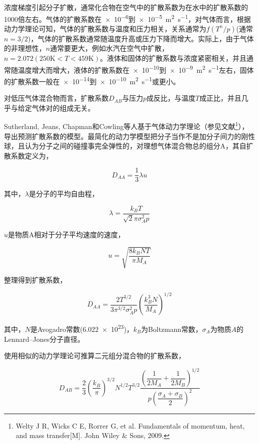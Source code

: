 浓度梯度引起分子扩散，通常化合物在空气中的扩散系数为在水中的扩散系数的1000倍左右。气体的扩散系数在\num{e-6}到\num{e-5}~\si{\square\meter\per\second}，对气体而言，根据动力学理论可知，气体的扩散系数与温度和压力相关，关系通常为$ f(T^n/p) $(通常$ n=3/2 $)，气体的扩散系数通常随温度升高或压力下降而增大。实际上，由于气体的非理想性，$ n $通常要更大，例如水汽在空气中扩散，$ n=2.072(250\si{\kelvin}<T<459\si{\kelvin}) $。液体和固体的扩散系数与浓度紧密相关，并且通常随温度增大而增大，液体的扩散系数在\num{e-10}到\num{e-9}~\si{\meter\squared\per\second}左右，固体的扩散系数一般在\num{e-14}到\num{e-10}~\si{\meter\squared\per\second}或更小。

对低压气体混合物而言，扩散系数$ D_{AB} $与压力$ p $成反比，与温度$ T $成正比，并且几乎与给定气体对的组成无关。

Sutherland, Jeans, Chapman和Cowling等人基于气体动力学理论（参见文献\footnote{Welty J R, Wicks C E, Rorrer G, et al. Fundamentals of momentum, heat, and mass transfer[M]. John Wiley \& Sons, 2009.}），导出预测扩散系数的模型。最简化的动力学模型把分子当作不是加分子间力的刚性球，且认为分子之间的碰撞事完全弹性的，对理想气体混合物总的组分A，其自扩散系数定义为，

\begin{equation}
D_{AA} = \frac{1}{3}\lambda u
\end{equation}

其中，$ \lambda $是分子的平均自由程，

\begin{equation}
\lambda = \frac{k_B T}{\sqrt{2}\pi\sigma_A^2 p}
\end{equation}

$ u $是物质A相对于分子平均速度的速度，

\begin{equation}
u = \sqrt{\frac{8k_B NT}{\pi M_A}}
\end{equation}

整理得到扩散系数，

\begin{equation}
D_{AA} = \frac{2T^{3/2}}{3\pi^{3/2}\sigma_A^2 p} \left( \frac{k_B^3 N}{M_A} \right)^{1/2}
\end{equation}

其中，$ N $是Avogadro常数(\num{6.022e23})，$ k_B $为Boltzmann常数，$ \sigma_A $为物质$ A $的Lennard–Jones分子直径。

使用相似的动力学理论可推算二元组分混合物的扩散系数，

\begin{equation}
D_{AB} = \frac{2}{3}\left(\frac{k_B}{\pi}\right)^{3/2}N^{1/2}T^{3/2}
\frac{\left(\dfrac{1}{2M_A}+\dfrac{1}{2M_B}\right)^{1/2}}
{p\left(\dfrac{\sigma_A+\sigma_B}{2}\right)^2}
\end{equation}

